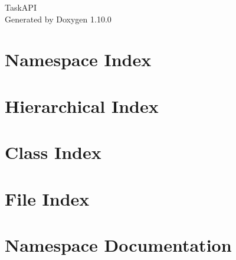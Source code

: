 \documentclass[twoside]{book}
\newcommand{\+}{\discretionary{\mbox{\scriptsize$\hookleftarrow$}}{}{}}
\newcommand{\clearemptydoublepage}{%
    \newpage{\pagestyle{empty}\cleardoublepage}%
  }
\begin{document}
  \raggedbottom
    \hypersetup{pageanchor=false,
                bookmarksnumbered=true,
                pdfencoding=unicode
               }
  \begin{titlepage}
  \vspace*{7cm}
  \begin{center}%
  {\Large Task\+API}\\
  \vspace*{1cm}
  {\large Generated by Doxygen 1.10.0}\\
  \end{center}
  \end{titlepage}
  \clearemptydoublepage
  \tableofcontents
  \clearemptydoublepage
  \hypersetup{pageanchor=true}

\chapter{Namespace Index}

\chapter{Hierarchical Index}

\chapter{Class Index}

\chapter{File Index}

\chapter{Namespace Documentation}













\end{document}
